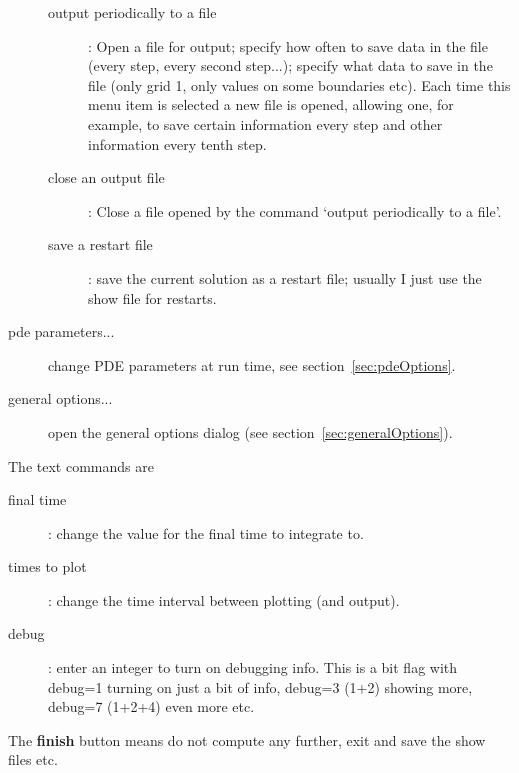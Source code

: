 \begin{description}
\begin{description}
       \item[\qquad output periodically to a file] : Open a file for output; specify how often to save data in the
        file (every step, every second step...); specify what data to save in the file (only grid 1, only
         values on some boundaries etc).  Each time this menu item is selected a new file is opened, allowing
         one, for example, to save certain information every step and other information every tenth step.
      \item[\qquad close an output file] : Close a file opened by the command `output periodically to a file'.
     \item[\qquad save a restart file] : save the current solution as a restart file; usually I just use the
       show file for restarts.
  \end{description}
  \item[\qquad pde parameters...] change PDE parameters at run time, see section~\ref{sec:pdeOptions}.
  \item[\qquad general options...] open the general options dialog (see section~\ref{sec:generalOptions}).
\end{description}

\noindent The text commands are 
\begin{description}
  \item[\qquad final time] : change the value for the final time to integrate to.
  \item[\qquad times to plot] : change the time interval between plotting (and output).
  \item[\qquad debug] : enter an integer to turn on debugging info. This is a bit flag with debug=1 turning on just
     a bit of info, debug=3 (1+2) showing more, debug=7 (1+2+4) even more etc.
\end{description}

\noindent The {\bf finish} button means do not compute any further, exit and save the show files etc.
